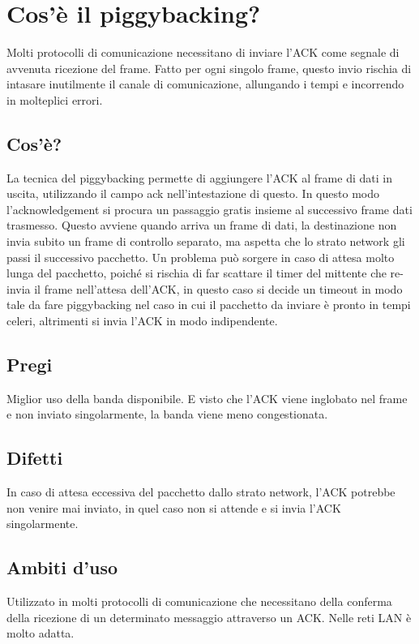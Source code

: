 \section{Cos'è il piggybacking?}

Molti protocolli di comunicazione necessitano di inviare l'ACK come segnale di avvenuta ricezione del frame.
Fatto per ogni singolo frame, questo invio rischia di intasare inutilmente il canale di comunicazione, allungando i tempi e incorrendo in molteplici errori.

\subsection{Cos'è?}
La tecnica del piggybacking permette di aggiungere l'ACK al frame di dati in uscita, utilizzando il campo ack nell'intestazione di questo. In questo modo l'acknowledgement si procura un passaggio gratis insieme al successivo frame dati trasmesso.
Questo avviene quando arriva un frame di dati, la destinazione non invia subito un frame di controllo separato, ma aspetta che lo strato network gli passi il successivo pacchetto.
Un problema può sorgere in caso di attesa molto lunga del pacchetto, poiché si rischia di far scattare il timer del mittente che re-invia il frame nell'attesa dell'ACK, in questo caso si decide un timeout in modo tale da fare piggybacking nel caso in cui il pacchetto da inviare è pronto in tempi celeri, altrimenti si invia l'ACK in modo indipendente.

\subsection{Pregi}
Miglior uso della banda disponibile. E visto che l'ACK viene inglobato nel frame e non inviato singolarmente, la banda viene meno congestionata.

\subsection{Difetti}
In caso di attesa eccessiva del pacchetto dallo strato network, l'ACK potrebbe non venire mai inviato, in quel caso non si attende e si invia l'ACK singolarmente.

\subsection{Ambiti d'uso}
Utilizzato in molti protocolli di comunicazione che necessitano della conferma della ricezione di un determinato messaggio attraverso un ACK. Nelle reti LAN è molto adatta.

